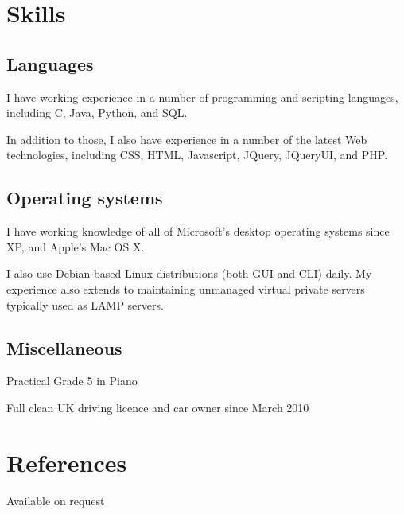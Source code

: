 \documentclass[11pt,a4paper]{article}
\begin{document}
\section*{Skills}

\subsection*{Languages}

I have working experience in a number of programming and scripting languages,
including C, Java, Python, and SQL.

In addition to those, I also have experience in a number of the latest Web
technologies, including CSS, HTML, Javascript, JQuery, JQueryUI, and PHP.

\subsection*{Operating systems}

I have working knowledge of all of Microsoft's desktop operating systems since
XP, and Apple's Mac OS X.

I also use Debian-based Linux distributions (both GUI and CLI) daily. My
experience also extends to maintaining unmanaged virtual private servers
typically used as LAMP servers.

\subsection*{Miscellaneous}

Practical Grade 5 in Piano

Full clean UK driving licence and car owner since March 2010

\section*{References}

Available on request
\end{document}
